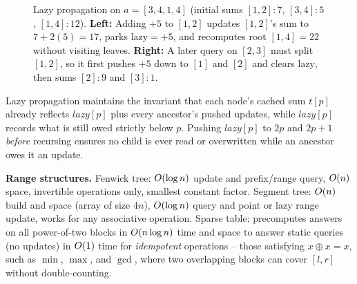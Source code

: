 \begin{figure}[htbp]
\caption{Lazy propagation on $a=[3,4,1,4]$ (initial sums $[1,2]:7$, $[3,4]:5$, $[1,4]:12$). \textbf{Left:} Adding $+5$ to $[1,2]$ updates $[1,2]$'s sum to $7 + 2(5) = 17$, parks $\text{lazy}=+5$, and recomputes root $[1,4]=22$ without visiting leaves. \textbf{Right:} A later query on $[2,3]$ must split $[1,2]$, so it first pushes $+5$ down to $[1]$ and $[2]$ and clears $\text{lazy}$, then sums $[2]:9$ and $[3]:1$.}
\label{ch42:fig-lazy-prop}
\end{figure}

\begin{whybox}
Lazy propagation maintains the invariant that each node's cached sum $t[p]$ already reflects $\textit{lazy}[p]$ plus every ancestor's pushed updates, while $\textit{lazy}[p]$ records what is still owed strictly below $p$. Pushing $\textit{lazy}[p]$ to $2p$ and $2p+1$ \emph{before} recursing ensures no child is ever read or overwritten while an ancestor owes it an update.
\end{whybox}

\begin{complexitybox}
\textbf{Range structures.} Fenwick tree: $O(\log n)$ update and prefix/range query, $O(n)$ space, invertible operations only, smallest constant factor. Segment tree: $O(n)$ build and space (array of size $4n$), $O(\log n)$ query and point or lazy range update, works for any associative operation. Sparse table: precomputes answers on all power-of-two blocks in $O(n\log n)$ time and space to answer static queries (no updates) in $O(1)$ time for \emph{idempotent} operations -- those satisfying $x \oplus x = x$, such as $\min$, $\max$, and $\gcd$, where two overlapping blocks can cover $[l,r]$ without double-counting.
\end{complexitybox}

